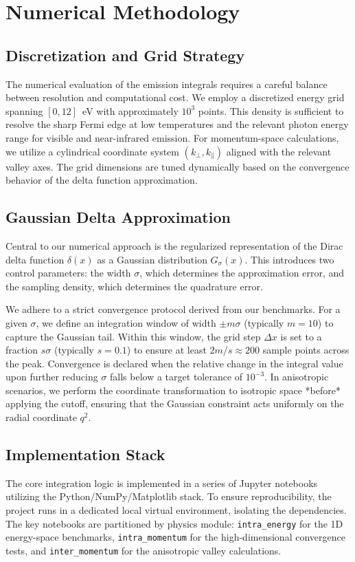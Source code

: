 \section{Numerical Methodology}

\subsection{Discretization and Grid Strategy}
The numerical evaluation of the emission integrals requires a careful balance between resolution and computational cost. We employ a discretized energy grid spanning $[0, 12]$~eV with approximately $10^3$ points. This density is sufficient to resolve the sharp Fermi edge at low temperatures and the relevant photon energy range for visible and near-infrared emission. For momentum-space calculations, we utilize a cylindrical coordinate system $(k_{\perp}, k_{\parallel})$ aligned with the relevant valley axes. The grid dimensions are tuned dynamically based on the convergence behavior of the delta function approximation.

\subsection{Gaussian Delta Approximation}
\label{sec:delta}
Central to our numerical approach is the regularized representation of the Dirac delta function $\delta(x)$ as a Gaussian distribution $G_{\sigma}(x)$. This introduces two control parameters: the width $\sigma$, which determines the approximation error, and the sampling density, which determines the quadrature error.

We adhere to a strict convergence protocol derived from our benchmarks. For a given $\sigma$, we define an integration window of width $\pm m\sigma$ (typically $m=10$) to capture the Gaussian tail. Within this window, the grid step $\Delta x$ is set to a fraction $s\sigma$ (typically $s=0.1$) to ensure at least $2m/s \approx 200$ sample points across the peak. Convergence is declared when the relative change in the integral value upon further reducing $\sigma$ falls below a target tolerance of $10^{-3}$. In anisotropic scenarios, we perform the coordinate transformation to isotropic space *before* applying the cutoff, ensuring that the Gaussian constraint acts uniformly on the radial coordinate $q^2$.

\subsection{Implementation Stack}
The core integration logic is implemented in a series of Jupyter notebooks utilizing the Python/NumPy/Matplotlib stack. To ensure reproducibility, the project runs in a dedicated local virtual environment, isolating the dependencies. The key notebooks are partitioned by physics module: \texttt{intra\_energy} for the 1D energy-space benchmarks, \texttt{intra\_momentum} for the high-dimensional convergence tests, and \texttt{inter\_momentum} for the anisotropic valley calculations.
